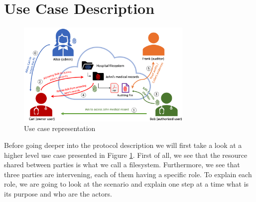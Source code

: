 \documentclass[../main.tex]{subfiles}
\begin{document}
\section{Use Case Description}
\label{section:problem:use_case}

\begin{figure}[h]
    \centering
    \includegraphics[width=0.75\textwidth]{../../images/problem/use_case}
    
    \caption{Use case representation}
    \label{figure:problem:use_case}
\end{figure}

\par Before going deeper into the protocol description we will first take a look at a higher level use case presented in Figure \ref{figure:problem:use_case}. First of all, we see that the resource shared between parties is what we call a filesystem. Furthermore, we see that three parties are intervening, each of them having a specific role. To explain each role, we are going to look at the scenario and explain one step at a time what is its purpose and who are the actors.
\end{document}
